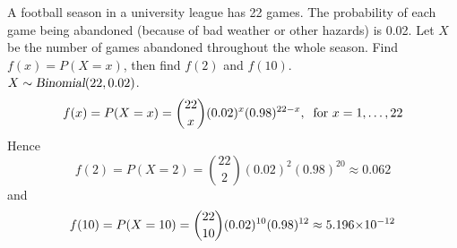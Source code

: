\begin{example}
A football season in a university league has 22 games. The probability of each game being abandoned (because of bad weather or other hazards) is 0.02. Let $X$ be the number of games abandoned throughout the whole season. Find $f(x)=P(X=x)$, then find $f(2)$ and $f(10)$. \\
$X\sim\operatorname{\textsl{Binomial}}(22,0.02)$.
\[
    f(x) = P(X = x) = \displaystyle\binom{22}{x} (0.02)^x (0.98)^{22-x},\:\text{ for } x = 1,\ldots,22
\]
Hence 
\[
    f(2) = P(X = 2) = \displaystyle\binom{22}{2} (0.02)^2 (0.98)^20 \approx 0.062
\]
and 
\[
    f(10) = P(X = 10) = \displaystyle\binom{22}{10} (0.02)^{10} (0.98)^{12} \approx {5.196}{\times}10^{-12}
\]
\end{example}